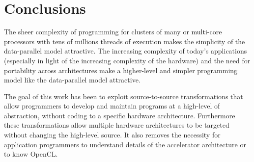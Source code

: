 \documentclass{doublecol-new}
\begin{document}





\maketitle






%


\section{Conclusions}

The sheer complexity of programming for clusters of many or multi-core
processors with tens of millions threads of execution makes the simplicity of
the data-parallel model attractive.  The increasing complexity of
today's applications (especially in light of the increasing complexity
of the hardware) and the need for portability across architectures
make a higher-level and simpler programming model like the data-parallel
model attractive.

The goal of this work has been to exploit source-to-source transformations that
allow programmers to develop and maintain programs at a high-level of
abstraction, without coding to a specific hardware architecture.
Furthermore these transformations allow multiple hardware architectures
to be targeted without changing the high-level source.  It also removes the
necessity for application programmers to understand details of the accelerator
architecture or to know OpenCL.




%
\newcommand{\newblock}{}



\newpage


\end{document}
